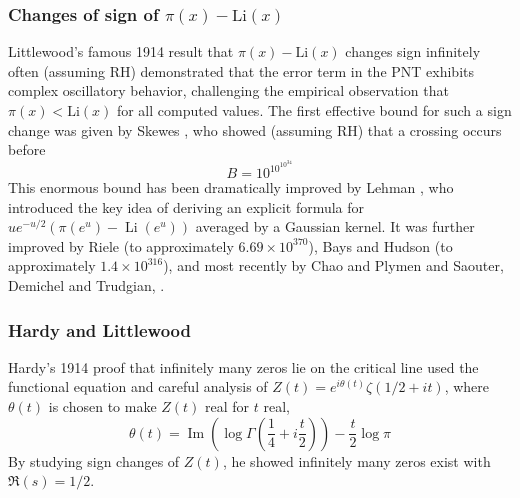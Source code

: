 \documentclass{article}
\begin{document}
   
   
   
   
    \subsubsection{Changes of sign of $\pi(x) - \mathrm{Li}(x)$}Littlewood's famous 1914 result \cite{LittlewoodZeroFree} that $\pi(x) - \mathrm{Li}(x)$ changes sign infinitely often (assuming RH) demonstrated that the error term in the PNT exhibits complex oscillatory behavior, challenging the empirical observation that $\pi(x) < \mathrm{Li}(x)$ for all computed values. The first effective bound for such a sign change was given by Skewes \cite{Skewes1933}, who showed (assuming RH) that a crossing occurs before
    $$
    B=10^{10^{10^{34}}}
    $$
      This enormous bound has been dramatically improved  by Lehman \cite{Lehman}, who introduced the key idea of deriving an explicit formula for $u e^{-u / 2}\left(\pi\left(e^u\right)-\operatorname{Li}\left(e^u\right)\right)$ averaged by a Gaussian kernel. It was further improved  by  Riele \cite{teRiele1987} (to approximately $6.69 \times 10^{370}$), Bays and Hudson \cite{BaysHudson2000} (to approximately $1.4 \times 10^{316}$), and most recently by Chao and Plymen \cite{ChaoPlymen2010} and Saouter,  Demichel and Trudgian\cite{SaouterDemichel2010}, \cite{SaouterTrudgianDemichel}.
    
     \subsubsection{Hardy and Littlewood}\label{Hardy-Littlewood} Hardy's 1914 proof \cite{Hardy} that infinitely many zeros lie on the critical line used the functional equation and careful analysis of $Z(t) = e^{i\theta(t)}\zeta(1/2 + it)$, where $\theta(t)$ is chosen to make $Z(t)$ real for $t$ real,
     $$
\theta(t)=\operatorname{Im}\left(\log \Gamma\left(\frac{1}{4}+i \frac{t}{2}\right)\right)-\frac{t}{2} \log \pi
$$ By studying sign changes of $Z(t)$, he showed infinitely many zeros exist with $\Re(s) = 1/2$.
\end{document}

